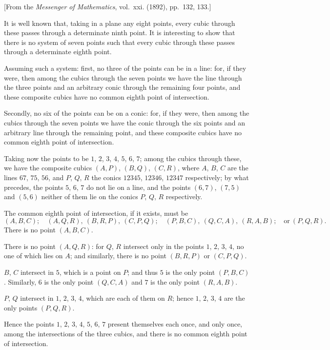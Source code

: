 \documentclass[11pt,a4paper]{book}
\begin{document}
[From the \textit{Messenger of Mathematics}, vol.~xxi. (1892), pp.~132, 133.]

\bigskip

It is well known that, taking in a plane any eight points, every cubic through
these passes through a determinate ninth point. It is interesting to show that there
is no system of seven points such that every cubic through these passes through a
determinate eighth point.

Assuming such a system: first, no three of the points can be in a line: for, if
they were, then among the cubics through the seven points we have the line
through the three points and an arbitrary conic through the remaining four points,
and these composite cubics have no common eighth point of intersection.

Secondly, no six of the points can be on a conic: for, if they were, then among
the cubics through the seven points we have the conic through the six points and
an arbitrary line through the remaining point, and these composite cubics have no
common eighth point of intersection.

Taking now the points to be $1$, $2$, $3$, $4$, $5$, $6$, $7$; among the cubics through
these, we have the composite cubics $(A, P)$, $(B, Q)$, $(C, R)$, where $A$, $B$, $C$ are the
lines $67$, $75$, $56$, and $P$, $Q$, $R$ the conics $12345$, $12346$, $12347$ respectively; by what
precedes, the points $5$, $6$, $7$ do not lie on a line, and the points $(6, 7)$, $(7, 5)$ and
$(5, 6)$ neither of them lie on the conics $P$, $Q$, $R$ respectively.

The common eighth point of intersection, if it exists, must be
\[
(A, B, C);\quad (A, Q, R),\ (B, R, P),\ (C, P, Q);\quad
(P, B, C),\ (Q, C, A),\ (R, A, B);\quad \text{or}\ (P, Q, R).
\]
There is no point $(A, B, C)$.

There is no point $(A, Q, R)$: for $Q$, $R$ intersect only in the points $1$, $2$, $3$, $4$,
no one of which lies on $A$; and similarly, there is no point $(B, R, P)$ or $(C, P, Q)$.

$B$, $C$ intersect in $5$, which is a point on $P$; and thus $5$ is the only point
$(P, B, C)$. Similarly, $6$ is the only point $(Q, C, A)$ and $7$ is the only point $(R, A, B)$.

$P$, $Q$ intersect in $1$, $2$, $3$, $4$, which are each of them on $R$; hence $1$, $2$, $3$, $4$
are the only points $(P, Q, R)$.

Hence the points $1$, $2$, $3$, $4$, $5$, $6$, $7$ present themselves each once, and only
once, among the intersections of the three cubics, and there is no common eighth point
of intersection.
\end{document}
